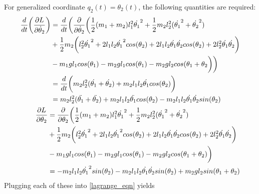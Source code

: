 For generalized coordinate $q_{2}(t) = \theta_{2}(t)$, the following quantities are required:
\begin{subequations}
\begin{align}
\begin{split}
	\frac{d}{dt} \bigg{(} \frac{\partial L}{\partial \dot{\theta}_{2}} \bigg{)}
	&= \frac{d}{dt} \bigg{(} \frac{\partial}{\partial \dot{\theta}_{2}} \bigg{(}
	\frac{1}{2}(m_{1} + m_{2})l_{1}^{2}\dot{\theta_{1}}^{2} +
	\frac{1}{2}m_{2}l_{2}^{2}(\dot{\theta_{1}}^{2} + \dot{\theta_{2}}^{2})
	\\
	& + \frac{1}{2}m_{2} \bigg{(} l_{2}^{2}\dot{\theta_{1}}^{2}
	+ 2l_{1}l_{2}\dot{\theta_{1}}^{2}cos(\theta_{2}) + 2l_{1}l_{2}\dot{\theta_{1}}\dot{\theta_{2}}cos(\theta_{2})
	+ 2l_{2}^{2}\dot{\theta_{1}}\dot{\theta_{2}} \bigg{)}
	\\
	& - m_{1}gl_{1}cos(\theta_{1}) - m_{2}gl_{1}cos(\theta_{1}) - m_{2}gl_{2}cos(\theta_{1} + \theta_{2}
	\bigg{)} \bigg{)}
	\\
	&= \frac{d}{dt} \bigg{(}
	m_{2}l_{2}^{2}(\dot{\theta_{1}} + \dot{\theta_{2}}) + m_{2}l_{1}l_{2}\dot{\theta_{1}}cos(\theta_{2})
	\bigg{)}
	\\
	&= m_{2}l_{2}^{2}(\ddot{\theta_{1}} + \ddot{\theta_{2}})
	+ m_{2}l_{1}l_{2}\ddot{\theta_{1}}cos(\theta_{2})
	- m_{2}l_{1}l_{2}\dot{\theta_{1}}\dot{\theta_{2}}sin(\theta_{2})
\end{split}
	\\
\begin{split}
	\frac{\partial L}{\partial \theta_{2}} &=
	\frac{\partial}{\partial \theta_{2}} \bigg{(}
	\frac{1}{2}(m_{1} + m_{2})l_{1}^{2}\dot{\theta_{1}}^{2} +
	\frac{1}{2}m_{2}l_{2}^{2}(\dot{\theta_{1}}^{2} + \dot{\theta_{2}}^{2})
	\\
	& + \frac{1}{2}m_{2} \bigg{(} l_{2}^{2}\dot{\theta_{1}}^{2}
	+ 2l_{1}l_{2}\dot{\theta_{1}}^{2}cos(\theta_{2}) + 2l_{1}l_{2}\dot{\theta_{1}}\dot{\theta_{2}}cos(\theta_{2})
	+ 2l_{2}^{2}\dot{\theta_{1}}\dot{\theta_{2}} \bigg{)}
	\\
	& - m_{1}gl_{1}cos(\theta_{1}) - m_{2}gl_{1}cos(\theta_{1}) - m_{2}gl_{2}cos(\theta_{1} + \theta_{2})
	\bigg{)}
	\\	
	&= -m_{2}l_{1}l_{2}\dot{\theta_{1}}^{2}sin(\theta_{2})
	- m_{2}l_{1}l_{2}\dot{\theta_{1}}\dot{\theta_{2}}sin(\theta_{2})
	+ m_{2}gl_{2}sin(\theta_{1} + \theta_{2})
\end{split}
\end{align}
\end{subequations}
Plugging each of these into \eqref{lagrange_eqn} yields
